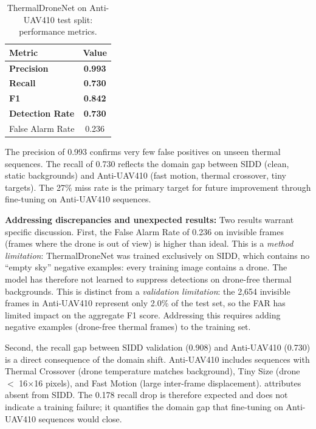 \documentclass[12pt,a4paper]{report}
\renewcommand{\arraystretch}{1.1}
\begin{document}
\begin{table}[H]
\centering
\caption[ThermalDroneNet on Anti-UAV410 test split: performance metrics]{ThermalDroneNet on Anti-UAV410 test split: performance metrics.}
\label{tab:antiuav410_performance}
\renewcommand{\arraystretch}{0.9}
\begin{tabular}{|l|c|}
\hline
\rowcolor{gray!20}
\textbf{Metric} & \textbf{Value} \\
\hline
\textbf{Precision}       & \textbf{0.993} \\
\hline
\textbf{Recall}          & \textbf{0.730} \\
\hline
\textbf{F1}              & \textbf{0.842} \\
\hline
\textbf{Detection Rate}  & \textbf{0.730} \\
\hline
False Alarm Rate  & 0.236 \\
\hline
\end{tabular}
\end{table}

The precision of 0.993 confirms very few false positives on unseen thermal
sequences. The recall of 0.730 reflects the domain gap between SIDD (clean,
static backgrounds) and Anti-UAV410 (fast motion, thermal crossover, tiny
targets). The 27\% miss rate is the primary target for future improvement
through fine-tuning on Anti-UAV410 sequences.

\textbf{Addressing discrepancies and unexpected results:}
Two results warrant specific discussion. First, the False Alarm Rate of 0.236
on invisible frames (frames where the drone is out of view) is higher than
ideal. This is a \textit{method limitation}: ThermalDroneNet was trained
exclusively on SIDD, which contains no ``empty sky'' negative examples:
every training image contains a drone. The model has therefore not learned
to suppress detections on drone-free thermal backgrounds. This is distinct
from a \textit{validation limitation}: the 2,654 invisible frames in
Anti-UAV410 represent only 2.0\% of the test set, so the FAR has limited
impact on the aggregate F1 score. Addressing this requires adding negative
examples (drone-free thermal frames) to the training set.

Second, the recall gap between SIDD validation (0.908) and Anti-UAV410
(0.730) is a direct consequence of the domain shift. Anti-UAV410 includes
sequences with Thermal Crossover (drone temperature matches background),
Tiny Size (drone $<$ 16$\times$16 pixels), and Fast Motion (large
inter-frame displacement). attributes absent from SIDD. The 0.178
recall drop is therefore expected and does not indicate a training failure;
it quantifies the domain gap that fine-tuning on Anti-UAV410 sequences
would close.
\end{document}
